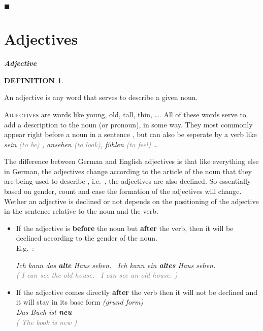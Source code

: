 \documentclass[a4paper,twocolumn,10pt]{article}
\newtheorem{mydef}{DEFINITION}[section]
\newcommand{\newpar}
{\par \vspace{0.3cm}}
\newcommand{\sectionend}
{
\nolinenumbers
\begin{center}
	$\blacksquare$
\end{center}
\clearpage
\linenumbers
}
\newcommand{\subsectionend}
{
\nolinenumbers
\linenumbers
}
\newcommand{\tcolorboxstart}
{
	\nolinenumbers
	\vspace{0.2cm}
	\centering
}
\newcommand{\tcolorboxend}
{
	\justifying
	\vspace{0.2cm}
	\linenumbers
}
\newcommand{\tcolorboxdefinition}[3]
{

\tcolorboxstart
\begin{defn-bg}

	\begin{defn-title}[width=7cm]{}
	{
		\normalsize \textbf{\textit{#1}}
	}
	\end{defn-title}

	\begin{defn-theword}
	{
		\footnotesize
		\begin{mydef} #2
		\end{mydef}
	}
	\end{defn-theword}


	\begin{defn-content}

	\justify
	#3

	\end{defn-content}

\end{defn-bg}
\tcolorboxend
}
\begin{document}
\subsectionend


\sectionend

\section{{Adjectives}}
\label{sec:adjectives}

\tcolorboxdefinition
{Adjective}
{\label{def:adjective}}
{

An adjective is any word that serves to describe a given noun.

}


\lettrine[lines=3, findent=3pt, nindent=0pt]{A}{djectives} are words like young,
old, tall, thin, \ldots . All of these words serve to add a description to the
noun (or pronoun), in some way. They most commonly appear right before a noun in
a sentence , but can also be seperate by a verb like \textit{sein
	\textcolor{gray}{(to be)} , ansehen \textcolor{gray}{(to look)}, fühlen
	\textcolor{gray}{(to feel)} }\ldots \newpar

The difference between German and English adjectives is that like everything
else in German, the adjectives change according to the article of the noun that
they are being used to describe , i.e.\ , the adjectives are also declined. So
essentially based on gender, count and case the formation of the adjectives will
change. Wether an adjective is declined or not depends on the positioning of the
adjective in the sentence relative to the noun and the verb.\newpar



\begin{itemize}[noitemsep]
	\item If the adjective is \textbf{before} the noun but \textbf{after} the
		verb, then it will be declined according to the gender of the noun.\\

E.g.\ :

\noindent
\textit{Ich kann das \textbf{alt\textcolor{green-goethe}{e}} Haus sehen. \ Ich
	kann ein \textbf{alt\textcolor{green-goethe}{es}} Haus sehen.}\\
\textcolor{gray} { \textit{( I can see the old house. \ I can see an old house. )} } \newpar

	\item If the adjective comes directly \textbf{after} the verb then it will
		not be declined and it will stay in its base form \textit{(grund
			form)}\\

\noindent
\textit{Das Buch ist \textbf{neu}}\\
\textcolor{gray} { \textit{( The book is new )} } \newpar




\end{itemize}
\end{document}
